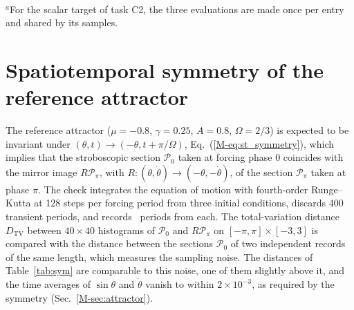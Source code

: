 \documentclass[10pt,letterpaper]{article}
\newcommand{\mref}[1]{\ref{M-#1}}
\begin{document}
\begin{table}[!htbp]
\caption{Cost benchmark of the conditional neural spline flow (NSF) and the denoising diffusion model (DDPM).}
\label{tab:cost}
\centering\footnotesize
\\[3pt]
\parbox{0.62\textwidth}{\footnotesize $^{a}$For the scalar target of task C2, the three evaluations are made once per entry and shared by its samples.}
\end{table}

\section{Spatiotemporal symmetry of the reference attractor}\label{sec:sym}

The reference attractor ($\mu=-0.8$, $\gamma=0.25$, $A=0.8$, $\Omega=2/3$) is expected to be invariant under $(\theta,t)\to(-\theta,t+\pi/\Omega)$, Eq.~(\mref{eq:st_symmetry}), which implies that the stroboscopic section $\mathcal P_0$ taken at forcing phase $0$ coincides with the mirror image $R\mathcal P_\pi$, with $R:(\theta,\dot\theta)\to(-\theta,-\dot\theta)$, of the section $\mathcal P_\pi$ taken at phase $\pi$. The check integrates the equation of motion with fourth-order Runge--Kutta at 128 steps per forcing period from three initial conditions, discards 400 transient periods, and records \symperiods\ periods from each. The total-variation distance $D_{\mathrm{TV}}$ between $40\times40$ histograms of $\mathcal P_0$ and $R\mathcal P_\pi$ on $[-\pi,\pi]\times[-3,3]$ is compared with the distance between the sections $\mathcal P_0$ of two independent records of the same length, which measures the sampling noise. The distances of Table~\ref{tab:sym} are comparable to this noise, one of them slightly above it, and the time averages of $\sin\theta$ and $\dot\theta$ vanish to within $2\times10^{-3}$, as required by the symmetry (Sec.~\mref{sec:attractor}).

\begin{table}[!htbp]
\caption{Symmetry check of the reference attractor: time averages and total-variation distance between the section at phase 0 and the mirrored section at phase $\pi$, compared with the distance between independent records.}
\label{tab:sym}
\centering\footnotesize

\end{table}

\clearpage
\end{document}

